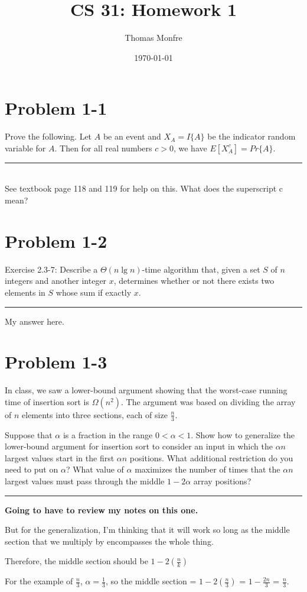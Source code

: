 \documentclass[11pt]{article}
\title{CS 31: Homework 1}
\author{Thomas Monfre}
\date{\today}
\def\separateline{\medskip\hrule\medskip}
\begin{document}
\maketitle

\section{Problem 1-1}
Prove the following. Let $A$ be an event and $X_A = I\{A\}$ be the indicator random variable for $A$. Then for all real numbers $c > 0$, we have $E[X_A^c] = Pr\{A\}$.
\separateline
\\See textbook page 118 and 119 for help on this. What does the superscript c mean?

\newpage

\section{Problem 1-2}
Exercise 2.3-7: Describe a $\Theta(n\lg{n})$-time algorithm that, given a set $S$ of $n$ integers and another integer $x$, determines whether or not there exists two elements in $S$ whose sum if exactly $x$.
\separateline
My answer here.

\newpage

\section{Problem 1-3}
In class, we saw a lower-bound argument showing that the worst-case running time of insertion sort is $\Omega(n^2)$. The argument was based on dividing the array of $n$ elements into three sections, each of size $\frac{n}{3}$.

Suppose that $\alpha$ is a fraction in the range $0 < \alpha < 1$. Show how to generalize the lower-bound argument for insertion sort to consider an input in which the $\alpha n$ largest values start in the first $\alpha n$ positions. What additional restriction do you need to put on $\alpha$? What value of $\alpha$ maximizes the number of times that the $\alpha n$ largest values must pass through the middle $1 - 2\alpha$ array positions?
\separateline
\textbf{Going to have to review my notes on this one.}

But for the generalization, I'm thinking that it will work so long as the middle section that we multiply by encompasses the whole thing.

Therefore, the middle section should be $1 - 2(\frac{n}{k})$

For the example of $\frac{n}{3}$, $\alpha = \frac{1}{3}$, so the middle section = $1 - 2(\frac{n}{3})$ = $1 - \frac{2n}{3}$ = $\frac{n}{3}$.
\end{document}
